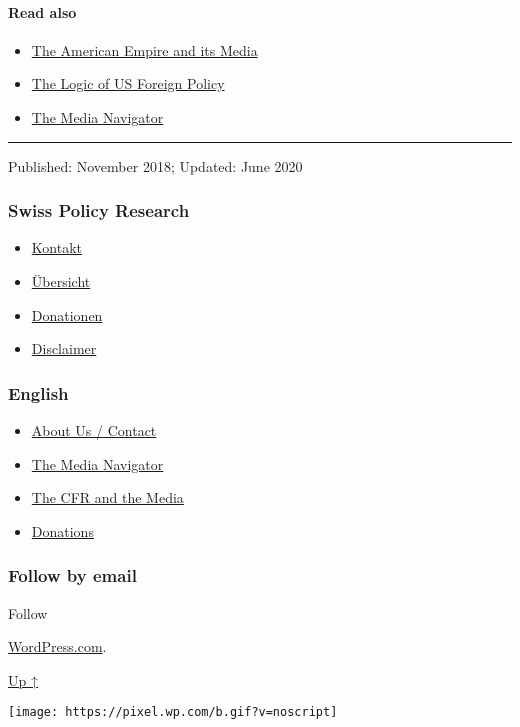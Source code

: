 \hypertarget{read-also}{%
\paragraph{Read also}\label{read-also}}

\begin{itemize}
\tightlist
\item
  \href{https://swprs.org/the-american-empire-and-its-media/}{The
  American Empire and its Media}
\item
  \href{https://swprs.org/us-foreign-policy/}{The Logic of US Foreign
  Policy}
\item
  \href{https://swprs.org/media-navigator/}{The Media Navigator}
\end{itemize}

\begin{center}\rule{0.5\linewidth}{\linethickness}\end{center}

Published: November 2018; Updated: June 2020

\hypertarget{swiss-policy-research}{%
\subsubsection{Swiss Policy Research}\label{swiss-policy-research}}

\begin{itemize}
\tightlist
\item
  \href{https://swprs.org/kontakt/}{Kontakt}
\item
  \href{https://swprs.org/uebersicht/}{Übersicht}
\item
  \href{https://swprs.org/donationen/}{Donationen}
\item
  \href{https://swprs.org/disclaimer/}{Disclaimer}
\end{itemize}

\hypertarget{english}{%
\subsubsection{English}\label{english}}

\begin{itemize}
\tightlist
\item
  \href{https://swprs.org/contact/}{About Us / Contact}
\item
  \href{https://swprs.org/media-navigator/}{The Media Navigator}
\item
  \href{https://swprs.org/the-american-empire-and-its-media/}{The CFR
  and the Media}
\item
  \href{https://swprs.org/donations/}{Donations}
\end{itemize}

\hypertarget{follow-by-email}{%
\subsubsection{Follow by email}\label{follow-by-email}}

Follow

\href{https://wordpress.com/?ref=footer_custom_com}{WordPress.com}.

\protect\hyperlink{}{Up ↑}

\texttt{[image: https://pixel.wp.com/b.gif?v=noscript]}
